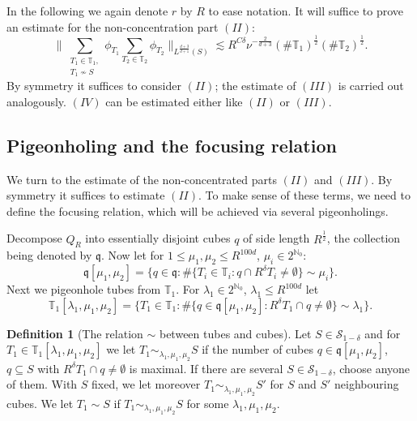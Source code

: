 \documentclass{amsart}
\theoremstyle{definition}
\newtheorem{definition}[theorem]{Definition}
\newcommand{\N}{\mathbb{N}}
\newcommand{\T}{\mathbb{T}}
\begin{document}
In the following we again denote $r$ by $R$ to ease notation. It will suffice to prove an estimate for the non-concentration part $(II)$:
\begin{equation*}
\big\| \sum_{\substack{T_1 \in \T_1, \\ T_1 \not\sim S}} \phi_{T_1} \sum_{T_2 \in \T_2} \phi_{T_2} \big\|_{L^{\frac{d+3}{d+1}}(S)} \lesssim R^{C \delta} \nu^{-\frac{2}{d+3}} (\# \T_1 )^{\frac{1}{2}} (\#  \T_2 )^{\frac{1}{2}}. 
\end{equation*}
By symmetry it suffices to consider $(II)$; the estimate of $(III)$ is carried out analogously. $(IV)$ can be estimated either like $(II)$ or $(III)$.

\subsection{Pigeonholing and the focusing relation}
\label{subsection:Pigeonholing}

We turn to the estimate of the non-concentrated parts $(II)$ and $(III)$. By symmetry it suffices to estimate $(II)$. 
To make sense of these terms, we need  
to define the focusing relation, which will be achieved via several pigeonholings.

\medskip

Decompose $Q_R$ into essentially disjoint cubes $q$ of side length $R^{\frac{1}{2}}$, the collection being denoted by $\mathfrak{q}$. Now let for $1 \leq \mu_1,\mu_2 \leq R^{100d}$, $\mu_i \in 2^{\N_0}$:
\begin{equation*}
\mathfrak{q}[\mu_1,\mu_2] = \{ q \in \mathfrak{q} : \# \{ T_i \in \T_i : q \cap R^\delta T_i \neq \emptyset \} \sim \mu_i \}.
\end{equation*}
Next we pigeonhole tubes from $\T_1$. For $\lambda_1 \in 2^{\N_0}$, $\lambda_1 \leq R^{100d}$ let
\begin{equation*}
\T_1[\lambda_1,\mu_1,\mu_2] = \{ T_1 \in \T_1 : \# \{ q \in \mathfrak{q}[\mu_1,\mu_2] : R^\delta T_1 \cap q \neq \emptyset \} \sim \lambda_1 \}.
\end{equation*}

\begin{definition}[The relation $\sim$ between tubes and cubes]
\label{def:FocusingRelation}
Let $S \in \mathcal{S}_{1-\delta}$ and for $T_1 \in \T_1[\lambda_1,\mu_1,\mu_2]$ we let $T_1 \sim_{\lambda_1,\mu_1,\mu_2} S$ if the number of cubes $q \in \mathfrak{q}[\mu_1,\mu_2]$, $q \subseteq S$ with $R^{\delta} T_1 \cap  q \neq \emptyset$ is maximal. If there are several $S \in \mathcal{S}_{1-\delta}$, choose anyone of them. With $S$ fixed, we let moreover $T_1 \sim_{\lambda_1,\mu_1,\mu_2} S'$ for $S$ and $S'$ neighbouring cubes.
 We let $T_1 \sim S$ if $T_1 \sim_{\lambda_1,\mu_1,\mu_2} S$ for some $\lambda_1,\mu_1,\mu_2$. 
\end{definition}
 
\end{document}
